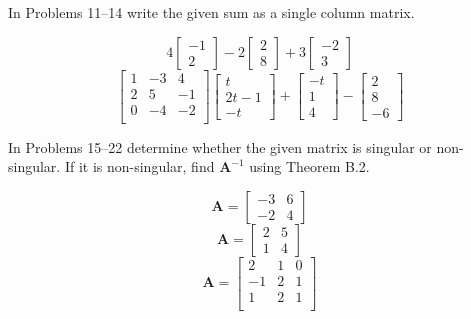 \documentclass[chapter=2,section=1]{math252homework}
\begin{document}
In Problems 11--14 write the given sum as a single column matrix.
\begin{problems}[start=11]
	\problem \[ 4 \left[ \begin{array}{c}
		-1\\
		 2
	\end{array} \right] - 2\left[ \begin{array}{c}
		2\\
		8
	\end{array} \right] + 3\left[ \begin{array}{c}
		-2\\
		3
	\end{array} \right] \]						%
	\setcounter{problemsi}{13}
	\problem \[ \left[ \begin{array}{ccc}
		1 & -3 & 4\\
		2 & 5 & -1\\
		0 & -4 & -2\\
	\end{array} \right]\left[ \begin{array}{c}
		t\\
		2t-1\\
		-t
	\end{array} \right] + \left[ \begin{array}{c}
		-t\\
		1\\
		4
	\end{array} \right] - \left[ \begin{array}{c}
		2\\
		8\\
		-6
	\end{array} \right] \]						%
\end{problems}

In Problems 15--22 determine whether the given matrix is singular or non-singular.
If it is non-singular, find $\mathbf{A}^{-1}$ using Theorem B.2.
\begin{problems}[start=15]
	\problem \[ \mathbf{A} = \left[ \begin{array}{cc}
		-3 & 6\\
		-2 & 4
	\end{array} \right] \]						%
	\problem \[ \mathbf{A} = \left[ \begin{array}{cc}
		2 & 5\\
		1 & 4
	\end{array} \right] \]						%
	\setcounter{problemsi}{18}
	\problem \[ \mathbf{A} = \left[ \begin{array}{ccc}
		2 & 1 & 0\\
		-1 & 2 & 1\\
		1 & 2 & 1\\
	\end{array} \right] \]						%
\end{problems}
\end{document}
